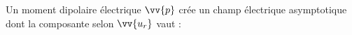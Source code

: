 \documentclass[a4paper]{article}
\begin{document}
\pagestyle{fancy}
\fancyhf{}
\setlength{\headheight}{15pt}

\begin{center}
	\large{}
\end{center}


Un moment dipolaire électrique \(\vv{p}\) crée un champ électrique asymptotique dont la composante selon \(\vv{u_r}\) vaut :\begin{center}\end{center}
\end{document}
